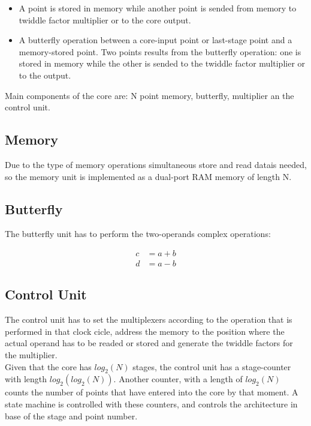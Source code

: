 \documentclass[conference]{IEEEtran}
\begin{document}
\begin{itemize}
  \item A point is stored in memory while another point is sended from memory to twiddle factor multiplier or to the core output.
  \item A butterfly operation between a core-input point or last-stage point and a memory-stored point. Two points results from the
  butterfly operation: one is stored in memory while the other is sended to the twiddle factor multiplier or to the output.  
\end{itemize}

Main components of the core are: N point memory, butterfly, multiplier an the control unit.


\subsection{Memory}

Due to the type of memory operations simultaneous store and read datais needed, so the memory unit is implemented as a dual-port RAM memory of length N. 

\subsection{Butterfly}

The butterfly unit has to perform the two-operands complex operations:

\begin{equation}
\begin{split}
c &= a+b \\
d &= a-b
\end{split}
\label{eq:butterf}
\end{equation} 

\subsection{Control Unit}

The control unit has to set the multiplexers according to the operation that is performed in that clock cicle, address the memory to the 
position where the actual operand has to be readed or stored and generate the twiddle factors for the multiplier.\\
Given that the core has $log_2(N)$ stages, the control unit has a stage-counter with length $log_2(log_2(N))$. Another counter, with a
length of $log_2(N)$ counts the number of points that have entered into the core by that moment. A state machine is controlled with 
these counters, and controls the architecture in base of the stage and point number.
\end{document}
